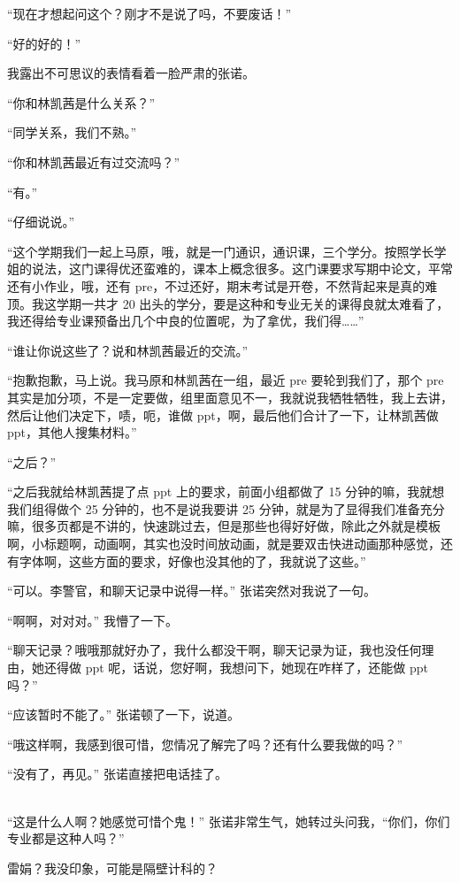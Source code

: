\documentclass[UTF8]{ctexart}
\begin{document}
“现在才想起问这个？刚才不是说了吗，不要废话！”

“好的好的！”

我露出不可思议的表情看着一脸严肃的张诺。

“你和林凯茜是什么关系？”

“同学关系，我们不熟。”

“你和林凯茜最近有过交流吗？”

“有。”

“仔细说说。”

“这个学期我们一起上马原，哦，就是一门通识，通识课，三个学分。按照学长学姐的说法，这门课得优还蛮难的，课本上概念很多。这门课要求写期中论文，平常还有小作业，哦，还有 pre，不过还好，期末考试是开卷，不然背起来是真的难顶。我这学期一共才 20 出头的学分，要是这种和专业无关的课得良就太难看了，我还得给专业课预备出几个中良的位置呢，为了拿优，我们得……”

“谁让你说这些了？说和林凯茜最近的交流。”

“抱歉抱歉，马上说。我马原和林凯茜在一组，最近 pre 要轮到我们了，那个 pre 其实是加分项，不是一定要做，组里面意见不一，我就说我牺牲牺牲，我上去讲，然后让他们决定下，啧，呃，谁做 ppt，啊，最后他们合计了一下，让林凯茜做 ppt，其他人搜集材料。”

“之后？”

“之后我就给林凯茜提了点 ppt 上的要求，前面小组都做了 15 分钟的嘛，我就想我们组得做个 25 分钟的，也不是说我要讲 25 分钟，就是为了显得我们准备充分嘛，很多页都是不讲的，快速跳过去，但是那些也得好好做，除此之外就是模板啊，小标题啊，动画啊，其实也没时间放动画，就是要双击快进动画那种感觉，还有字体啊，这些方面的要求，好像也没其他的了，我就说了这些。”

“可以。李警官，和聊天记录中说得一样。” 张诺突然对我说了一句。

“啊啊，对对对。” 我懵了一下。

“聊天记录？哦哦那就好办了，我什么都没干啊，聊天记录为证，我也没任何理由，她还得做 ppt 呢，话说，您好啊，我想问下，她现在咋样了，还能做 ppt 吗？”

“应该暂时不能了。” 张诺顿了一下，说道。

“哦这样啊，我感到很可惜，您情况了解完了吗？还有什么要我做的吗？”

“没有了，再见。” 张诺直接把电话挂了。

~\\

“这是什么人啊？她感觉可惜个鬼！” 张诺非常生气，她转过头问我，“你们，你们专业都是这种人吗？”

雷娟？我没印象，可能是隔壁计科的？
\end{document}

